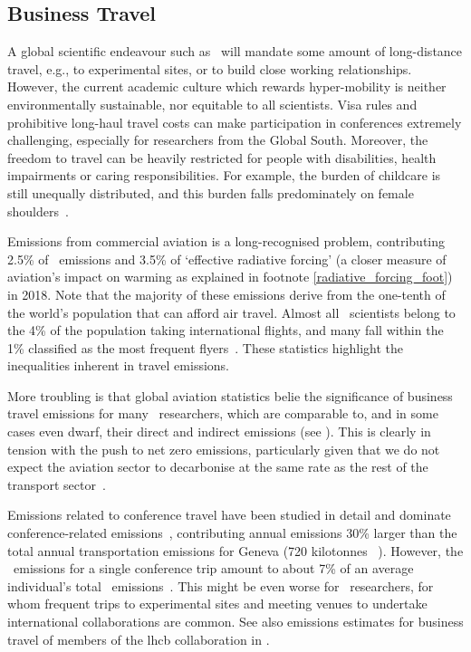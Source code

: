 \documentclass[../SustainableHEP.tex]{subfiles}
\begin{document}
\subsection{Business Travel}

A global scientific endeavour such as \ACR\ will mandate some amount of long-distance travel, e.g., to experimental sites, or to build close working relationships.  However, the current academic culture which rewards hyper-mobility is neither environmentally sustainable, nor equitable to all scientists.  Visa rules and prohibitive long-haul travel costs can make participation in conferences extremely challenging, especially for researchers from the Global South. Moreover, the freedom to travel can be heavily restricted for people with disabilities, health impairments or caring responsibilities. For example, the burden of childcare is still unequally distributed, and this burden falls predominately on female shoulders~\cite{McCarthy}.

Emissions from commercial aviation is a long-recognised problem, contributing 2.5\% of \CdO\ emissions and 3.5\% of ‘effective radiative forcing’ (a closer measure of aviation's impact on warming as explained in footnote \ref{radiative_forcing_foot})~\cite{Rit20} in 2018.  Note that the majority of these emissions derive from the one-tenth of the world’s population that can afford air travel.  Almost all \ACR\ scientists belong to the 4\% of the population taking international flights, and many fall within the 1\% classified as the most frequent flyers~\cite{GOSSLING2020102194}.  These statistics highlight the inequalities inherent in travel emissions.

More troubling is that global aviation statistics belie the significance of business travel emissions for many \ACR\ researchers, which are comparable to, and in some cases even dwarf, their direct and indirect emissions (see ).  This is clearly in tension with the push to net zero emissions, particularly given that we do not expect the aviation sector to decarbonise at the same rate as the rest of the transport sector~\cite{Gota2019,Science18}.

Emissions related to conference travel have been studied in detail and dominate conference-related emissions~\cite{Spinellis, nature_better_confs}, contributing annual emissions 30\% larger than the total annual transportation emissions for Geneva (720 kilotonnes \CdO~\cite{Geneve}).  However, the \CdO\ emissions for a single conference trip amount to about 7\% of an average individual’s total \CdO\ emissions~\cite{Spinellis}. This might be even worse for \ACR\ researchers, for whom frequent trips to experimental sites and meeting venues to undertake international collaborations are common.  See also emissions estimates for business travel of members of the \acrshort{lhcb} collaboration in .
\end{document}
